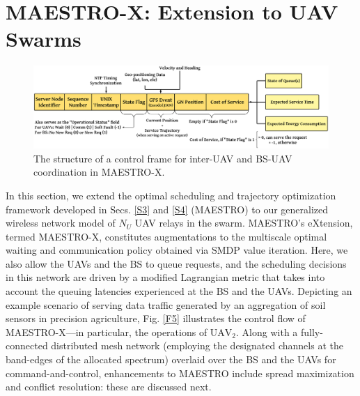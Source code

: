 \documentclass[10pt, twocolumn]{IEEEtran}
\theoremstyle{plain}
\theoremstyle{definition}
\theoremstyle{remark}
\begin{document}
\section{MAESTRO-X: Extension to UAV Swarms}\label{S5}
\begin{figure} [t]
    \centering
    \includegraphics[width=0.8\linewidth]{figs/Control_Frame_Design.png}
    \vspace{-2mm}
    \caption{The structure of a control frame for inter-UAV and BS-UAV coordination in MAESTRO-X.}
     \vspace{-6mm}
    \label{F5.5}
\end{figure}
In this section, we  extend the optimal scheduling and trajectory optimization framework developed in Secs. \ref{S3} and \ref{S4} (MAESTRO) to our generalized wireless network model of $N_{U}$ UAV relays in the swarm. MAESTRO's eXtension, termed MAESTRO-X, constitutes augmentations to the multiscale optimal {waiting} and {communication} policy obtained via SMDP value iteration. Here, we also allow the UAVs and the BS to queue requests, and the scheduling decisions in this network are driven by a modified Lagrangian metric that takes into account the queuing latencies experienced at the BS and the UAVs. Depicting an example scenario of serving data traffic generated by an aggregation of soil sensors in precision agriculture, Fig. \ref{F5} illustrates the control flow of MAESTRO-X---in particular, the operations of $\mathrm{UAV}_{2}$. Along with a fully-connected distributed mesh network (employing the designated channels at the band-edges of the allocated spectrum) overlaid over the BS and the UAVs for command-and-control, enhancements to MAESTRO include spread maximization and conflict resolution: these are discussed next.\\
\end{document}
